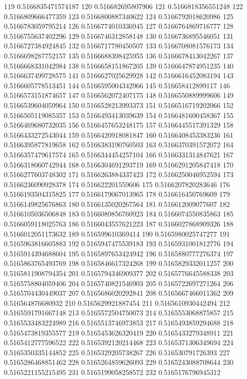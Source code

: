 119 0.5166835471574187
120 0.516682695807906
121 0.5166818356551248
122 0.5166809666477359
123 0.5166800887340622
124 0.5166792018620986
125 0.5166783059795214
126 0.5166774010336945
127 0.5166764869716777
128 0.5166755637402296
129 0.5166746312858148
130 0.5166736895546051
131 0.5166727384924845
132 0.5166717780450507
133 0.5166708081576173
134 0.5166698287752157
135 0.5166688398425955
136 0.5166678413042267
137 0.5166668331042984
138 0.5166658151867205
139 0.5166647874951235
140 0.5166637499728575
141 0.5166627025629928
142 0.5166616452083194
143 0.5166605778513451
144 0.5166595004342966
145 0.516658412899117
146 0.5166573151874657
147 0.5166562072407175
148 0.5166550889999606
149 0.5166539604059964
150 0.5166528213993373
151 0.5166516719202066
152 0.5166505119085357
153 0.5166493413039639
154 0.5166481600458367
155 0.5166469680732035
156 0.5166457653248175
157 0.5166445517391329
158 0.5166433272543044
159 0.5166420918081847
160 0.5166408453383236
161 0.5166395877819658
162 0.5166383190760503
163 0.5166370391572072
164 0.5166357479617574
165 0.5166344454257104
166 0.5166331314847621
167 0.5166318060742944
168 0.5166304691293719
169 0.5166291205847418
170 0.5166277603748302
171 0.5166263884337423
172 0.5166250046952594
173 0.5166236090928378
174 0.516622201559606
175 0.5166207820283646
176 0.5166193504315825
177 0.5166179067013965
178 0.516616450769609
179 0.5166149825676863
180 0.5166135020267564
181 0.516612009077607
182 0.5166105036506848
183 0.5166089856760923
184 0.5166074550835863
185 0.5166059118025763
186 0.5166043557621223
187 0.5166027868909326
188 0.5166012051173632
189 0.516599610369414
190 0.5165980025747277
191 0.5165963816605883
192 0.5165947475539183
193 0.5165931001812776
194 0.5165914394688604
195 0.5165897653424942
196 0.5165880777276374
197 0.5165863765493769
198 0.5165846617324268
199 0.5165829332011257
200 0.5165811908794354
201 0.5165794346909377
202 0.5165776645588338
203 0.5165758804059406
204 0.5165740821546903
205 0.5165722697271264
206 0.5165704430449037
207 0.5165686020292841
208 0.5165667466011362
209 0.516564876680932
210 0.5165629921887454
211 0.5165610930442494
212 0.5165591791667148
213 0.5165572504750073
214 0.5165553068875857
215 0.5165533483224989
216 0.5165513746973853
217 0.5165493859294688
218 0.5165473819355577
219 0.5165453626320419
220 0.5165433279348911
221 0.5165412777596522
222 0.5165392120214468
223 0.5165371306349694
224 0.5165350335144852
225 0.5165329205738267
226 0.516530791726393
227 0.5165286468851462
228 0.5165264859626093
229 0.5165243088708644
230 0.5165221155215495
231 0.5165199058258572
232 0.5165176796945312

